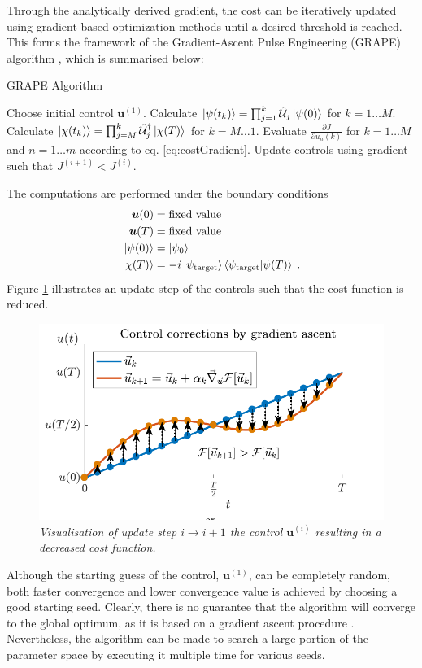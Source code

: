 Through the analytically derived gradient, the cost can be iteratively updated using gradient-based optimization methods until a desired threshold is reached. This forms the framework of the Gradient-Ascent Pulse Engineering (GRAPE) algorithm \cite{Khaneja2005}, which is summarised below:

\begin{algorithm}
\begin{algorithmic}
\caption{GRAPE Algorithm}
\State Choose initial control $\boldsymbol{u}^{(1)}$.
	\State Calculate $\ket{\psi (t_k)} = \prod_{j=1}^{k} \hat{\mathcal{U}}_j \ket{\psi (0)}$ for $k = 1 \ldots M$.
	\State Calculate $\ket{\chi (t_k)} = \prod_{j=M}^{k} \hat{\mathcal{U}}_{j}^{\dag} \ket{\chi (T)}$ for $k = M \ldots 1$. 
	\State Evaluate $\frac{\partial J}{\partial u_n (k)}$ for $k = 1 \ldots M$ and $n = 1 \ldots m$ according to eq. \eqref{eq:costGradient}.
	\State Update controls using gradient such that $J^{(i + 1)} < J^{(i)}$. 
\EndWhile
\end{algorithmic}
\end{algorithm}
The computations are performed under the boundary conditions
\begin{align}
	\boldsymbol{u}(0) &= \text{fixed value} \\
	\boldsymbol{u}(T) &= \text{fixed value} \\
	\ket{\psi (0)} &= \ket{\psi_0} \\
	\ket{\chi (T)} &= -i \ket{\psi_{\mathrm{target}}} \braket{\psi_{\mathrm{target}} | \psi (T)} \; .
\end{align}
Figure \ref{fig:ControlUpdate} illustrates an update step of the controls such that the cost function is reduced.
\begin{figure}[!h]
	\centering
	\includegraphics[width=0.7\columnwidth]{Figures/ControlUpdate.pdf} 
	\caption{ \textit{Visualisation of update step $i \to i+1$ the control $\boldsymbol{u}^{(i)}$ resulting in a decreased cost function.}}
	\label{fig:ControlUpdate} 
\end{figure} 
Although the starting guess of the control, $\boldsymbol{u}^{(1)}$, can be completely random, both faster convergence and lower convergence value is achieved by choosing a good starting seed. Clearly, there is no guarantee that the algorithm will converge to the global optimum, as it is based on a gradient ascent procedure \cite{Khaneja2005}. Nevertheless, the algorithm can be made to search a large portion of the parameter space by executing it multiple time for various seeds.  



